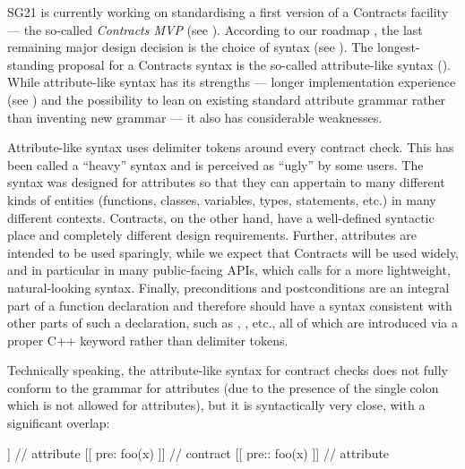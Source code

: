 SG21 is currently working on standardising a first version of a Contracts facility --- the so-called \emph{Contracts MVP} (see \cite{P2900R0}). According to our roadmap \cite{P2695R1}, the last remaining major design decision is the choice of syntax (see \cite{P2885R3}). The longest-standing proposal for a Contracts syntax is the so-called attribute-like syntax (\cite{P2935R3}). While attribute-like syntax has its strengths --- longer implementation experience (see \cite{P1680R0}) and the possibility to lean on existing standard attribute grammar rather than inventing new grammar --- it also has considerable weaknesses.

Attribute-like syntax uses \tcode{[[...]]} delimiter tokens around every contract check. This has been called a ``heavy'' syntax and is  perceived as ``ugly'' by some users. The \tcode{[[...]]} syntax was designed for attributes so that they can appertain to many different kinds of entities (functions, classes, variables, types, statements, etc.) in many different contexts. Contracts, on the other hand, have a well-defined syntactic place and completely different design requirements. Further, attributes are intended to be used sparingly, while we expect that Contracts will be used widely, and in particular in many public-facing APIs, which calls for a more lightweight, natural-looking syntax. Finally, preconditions and postconditions are an integral part of a function declaration and therefore should have a syntax consistent with other parts of such a declaration, such as , , etc., all of which are introduced via a proper C++ keyword rather than delimiter tokens.

Technically speaking, the attribute-like syntax for contract checks does not fully conform to the grammar for attributes (due to the presence of the single colon which is not allowed for attributes), but it is syntactically very close, with a significant overlap:

\begin{codeblock}
[[ pre(foo(x)) ]]  // attribute
[[ pre: foo(x) ]]  // contract
[[ pre:: foo(x) ]] // attribute
\end{codeblock}

